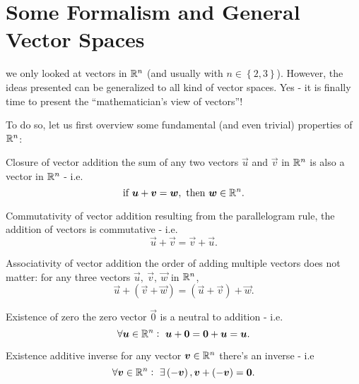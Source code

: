 \section{Some Formalism and General Vector Spaces}
 we only looked at vectors in $\Rs[n]$ (and usually with $n\in\left\{2,3\right\}$). However, the ideas presented can be generalized to all kind of vector spaces. Yes - it is finally time to present the \enquote{mathematician's view of vectors}!

To do so, let us first overview some fundamental (and even trivial) properties of $\Rs[n]$:
\begin{descitemize}
    \item[Closure of vector addition] the sum of any two vectors $\vec{u}$ and $\vec{v}$ in $\Rs[n]$ is also a vector in $\Rs[n]$ - i.e. 
    \begin{equation}
        \text{if}\ \vec{u}+\vec{v}=\vec{w},\ \text{then}\ \vec{w}\in\Rs[n].
        \label{eq:vector_addition_closure}
    \end{equation}
    
    \item[Commutativity of vector addition] resulting from the parallelogram rule, the addition of vectors is commutative - i.e.
    \begin{equation}
        \vec{u}+\vec{v}=\vec{v}+\vec{u}.
        \label{eq:vector_addition_commutative_2}
    \end{equation}

    \item[Associativity of vector addition] the order of adding multiple vectors does not matter: for any three vectors $\vec{u},\ \vec{v},\ \vec{w}$ in $\Rs[n]$,
    \begin{equation}
        \vec{u}+\left(\vec{v}+\vec{w}\right) = \left(\vec{u}+\vec{v}\right)+\vec{w}.
        \label{eq:vector_addition_associative}
    \end{equation}
    
    \item[Existence of zero] the zero vector $\vec{0}$ is a neutral to addition - i.e.
    \begin{equation}
        \forall \vec{u}\in\Rs[n]:\ \vec{u}+\vec{0}=\vec{0}+\vec{u}=\vec{u}.
        \label{eq:vector_zero_existence}
    \end{equation}

    \item[Existence additive inverse] for any vector $\vec{v}\in\Rs[n]$ there's an inverse - i.e
    \begin{equation}
        \forall \vec{v}\in\Rs[n]:\ \exists\left(-\vec{v}\right), \vec{v}+\left(-\vec{v}\right) = \vec{0}.
        \label{eq:vector_zero_addition}
    \end{equation}


\end{descitemize}
